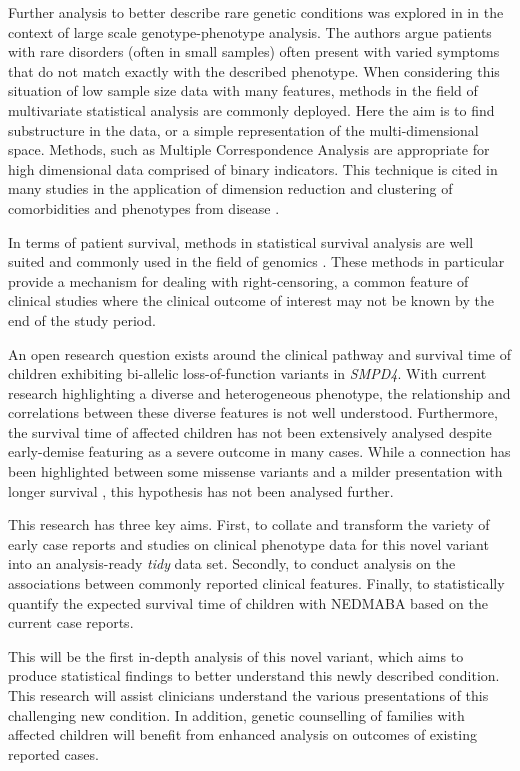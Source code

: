 \documentclass[
  authoryear,
  preprint,
  3p]{elsarticle}
\begin{document}
Further analysis to better describe rare genetic conditions was explored
in \citet{diaz2020phenotype} in the context of large scale
genotype-phenotype analysis. The authors argue patients with rare
disorders (often in small samples) often present with varied symptoms
that do not match exactly with the described phenotype. When considering
this situation of low sample size data with many features, methods in
the field of multivariate statistical analysis are commonly deployed.
Here the aim is to find substructure in the data, or a simple
representation of the multi-dimensional space. Methods, such as Multiple
Correspondence Analysis \citep{le2010multiple} are appropriate for high
dimensional data comprised of binary indicators. This technique is cited
in many studies in the application of dimension reduction and clustering
of comorbidities and phenotypes from disease
\citep{han2018cluster, costa2013use}.

In terms of patient survival, methods in statistical survival analysis
are well suited and commonly used in the field of genomics
\citep{chen2014survival}. These methods in particular provide a
mechanism for dealing with right-censoring, a common feature of clinical
studies where the clinical outcome of interest may not be known by the
end of the study period.

An open research question exists around the clinical pathway and
survival time of children exhibiting bi-allelic loss-of-function
variants in \emph{SMPD4}. With current research highlighting a diverse
and heterogeneous phenotype, the relationship and correlations between
these diverse features is not well understood. Furthermore, the survival
time of affected children has not been extensively analysed despite
early-demise featuring as a severe outcome in many cases. While a
connection has been highlighted between some missense variants and a
milder presentation with longer survival \citep{magini2019loss}, this
hypothesis has not been analysed further.

This research has three key aims. First, to collate and transform the
variety of early case reports and studies on clinical phenotype data for
this novel variant into an analysis-ready \emph{tidy} data set.
Secondly, to conduct analysis on the associations between commonly
reported clinical features. Finally, to statistically quantify the
expected survival time of children with NEDMABA based on the current
case reports.

This will be the first in-depth analysis of this novel variant, which
aims to produce statistical findings to better understand this newly
described condition. This research will assist clinicians understand the
various presentations of this challenging new condition. In addition,
genetic counselling of families with affected children will benefit from
enhanced analysis on outcomes of existing reported cases.
\end{document}
